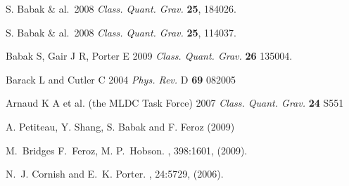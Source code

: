 \documentclass{iopart}
\begin{document}
\begin{thebibliography}{99}

S. Babak \& al.~2008 \textit{Class. Quant. Grav.} \textbf{25}, 184026.

S. Babak \& al.~2008 \textit{Class. Quant. Grav.} \textbf{25}, 114037.

 Babak S, Gair J R, Porter E 2009 \textit{Class. Quant. Grav.} \textbf{26} 135004.

 Barack L and Cutler C 2004 \textit{Phys. Rev.} D \textbf{69} 082005

 Arnaud K A et al. (the MLDC Task Force) 2007 \textit{Class. Quant. Grav.} \textbf{24} S551

A. Petiteau, Y. Shang, S. Babak and  F. Feroz
 (2009)

M.~Bridges F.~Feroz, M. P.~Hobson.
, 398:1601, (2009).


N.~J. Cornish and E.~K. Porter.
, 24:5729, (2006).


\end{thebibliography}
\end{document}
